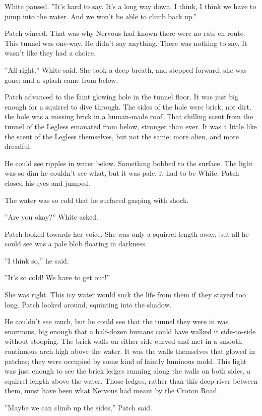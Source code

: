 \documentclass[12pt]{book}
\begin{document}
White paused. ''It's hard to say. It's a long way down. I think, I
think we have to jump into the water. And we won't be able to climb
back up.''

Patch winced. That was why Nervous had known there were no rats en
route. This tunnel was one-way. He didn't say anything. There was
nothing to say. It wasn't like they had a choice.

''All right,'' White said. She took a deep breath, and stepped
forward; she was gone; and a splash came from below.

Patch advanced to the faint glowing hole in the tunnel floor. It was
just big enough for a squirrel to dive through. The sides of the hole
were brick, not dirt, the hole was a missing brick in a human-made
roof. That chilling scent from the tunnel of the Legless emanated from
below, stronger than ever. It was a little like the scent of the
Legless themselves, but not the same; more alien, and more dreadful.

He could see ripples in water below. Something bobbed to the
surface. The light was so dim he couldn't see what, but it was pale,
it had to be White. Patch closed his eyes and jumped.

The water was so cold that he surfaced gasping with shock.

''Are you okay?'' White asked.

Patch looked towards her voice. She was only a squirrel-length away,
but all he could see was a pale blob floating in darkness.

''I think so,'' he said.

''It's so cold! We have to get out!''

She was right. This icy water would suck the life from them if they
stayed too long. Patch looked around, squinting into the shadow.

He couldn't see much, but he could see that the tunnel they were in
was enormous, big enough that a half-dozen humans could have walked it
side-to-side without stooping. The brick walls on either side curved
and met in a smooth continuous arch high above the water. It was the
walls themselves that glowed in patches; they were occupied by some
kind of faintly luminous mold. This light was just enough to see the
brick ledges running along the walls on both sides, a squirrel-length
above the water. Those ledges, rather than this deep river between
them, must have been what Nervous had meant by the Croton Road.

''Maybe we can climb up the sides,'' Patch said.
\end{document}
